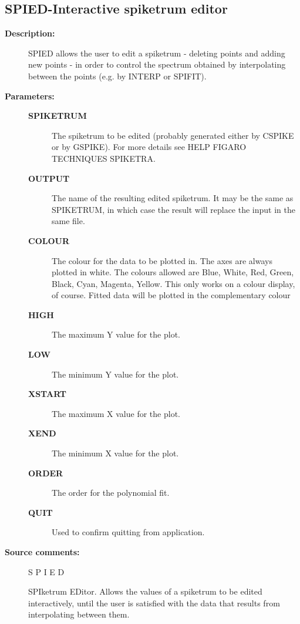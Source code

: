 \subsection{SPIED-\label{SPIED}Interactive spiketrum editor}
\begin{description}

\item [\textbf{Description:}]
 SPIED allows the user to edit a spiketrum - deleting points and
 adding new points - in order to control the spectrum obtained
 by interpolating between the points (e.g. by INTERP or SPIFIT).

\item [\textbf{Parameters:}]
\begin{description}
\item [\textbf{SPIKETRUM}]
 The spiketrum to be edited (probably generated either by
 CSPIKE or by GSPIKE).  For more details see HELP FIGARO TECHNIQUES
 SPIKETRA.
\item [\textbf{OUTPUT}]
 The name of the resulting edited spiketrum.  It may be the
 same as SPIKETRUM, in which case the result will replace the input in
 the same file.
\item [\textbf{COLOUR}]
 The colour for the data to be plotted in.
 The axes are always plotted in white.  The colours allowed are Blue,
 White, Red, Green, Black, Cyan, Magenta, Yellow.  This only works on
 a colour display, of course.  Fitted data will be plotted in the
 complementary colour
\item [\textbf{HIGH}]
 The maximum Y value for the plot.
\item [\textbf{LOW}]
 The minimum Y value for the plot.
\item [\textbf{XSTART}]
 The maximum X value for the plot.
\item [\textbf{XEND}]
 The minimum X value for the plot.
\item [\textbf{ORDER}]
 The order for the polynomial fit.
\item [\textbf{QUIT}]
 Used to confirm quitting from application.
\end{description}

\item [\textbf{Source comments:}]
\begin{terminalv}
 S P I E D

 SPIketrum EDitor.  Allows the values of a spiketrum to be
 edited interactively, until the user is satisfied with the
 data that results from interpolating between them.


\end{terminalv}
\end{description}
